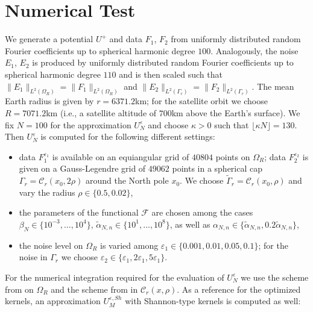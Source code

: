 \documentclass[a4paper, 10pt]{article}
\numberwithin{equation}{section}
\theoremstyle{definition}
\begin{document}
\section{Numerical Test}\label{sec:num}%

We generate a potential $U^+$ and data $F_1$, $F_2$ from uniformly distributed random Fourier coefficients up to spherical harmonic degree $100$. Analogously, the noise $E_1$, $E_2$ is produced by uniformly distributed random Fourier coefficients up to spherical harmonic degree $110$ and is then scaled such that $\|E_1\|_{L^2(\Omega_R)}=\|F_1\|_{L^2(\Omega_R)}$ and $\|E_2\|_{L^2(\Gamma_r)}=\|F_2\|_{L^2(\Gamma_r)}$. The mean Earth radius is given by $r=6371.2$km; for the satellite orbit we choose $R=7071.2$km (i.e., a satellite altitude of $700$km above the Earth's surface). We fix $N=100$ for the approximation $U_N^\varepsilon$ and choose $\kappa>0$ such that $\lfloor \kappa N\rfloor=130$. Then $U_N^\varepsilon$ is computed for the following different settings: 
\begin{itemize}
 \item[(a)] data $F_1^{\varepsilon_1}$ is available on an equiangular grid of $40804$ points on $\Omega_R$; data $F_2^{\varepsilon_2}$ is given on a Gauss-Legendre grid of $49062$ points in a spherical cap $\Gamma_r=\mathcal{C}_r(x_0,2\rho)$ around the North pole $x_0$. We choose $\tilde{\Gamma}_r=\mathcal{C}_r(x_0,\rho)$ and vary the radius $\rho\in\{0.5,0.02\}$, 
 \item[(b)] the parameters of the functional $\mathcal{F}$ are chosen among the cases $\beta_N\in\{10^{-3},\ldots,10^{4}\}$, $\tilde{\alpha}_{N,n}\in\{10^{1},\ldots, 10^{8}\}$, as well as ${\alpha}_{N,n}\in\{\tilde{\alpha}_{N,n},0.2\tilde{\alpha}_{N,n}\}$,
 \item[(c)] the noise level on $\Omega_R$ is varied among $\varepsilon_1\in\{0.001,0.01,0.05,0.1\}$; for the noise in $\Gamma_r$ we choose $\varepsilon_2\in\{\varepsilon_1,2\varepsilon_1,5\varepsilon_1\}$.
\end{itemize}
For the numerical integration required for the evaluation of $U_N^\varepsilon$ we use the scheme from \cite{drihea} on $\Omega_R$ and the scheme from \cite{womers12} in $\mathcal{C}_r(x,\rho)$. As a reference for the optimized kernels, an approximation $U_M^{\varepsilon,Sh}$ with Shannon-type kernels is computed as well: 
\end{document}

